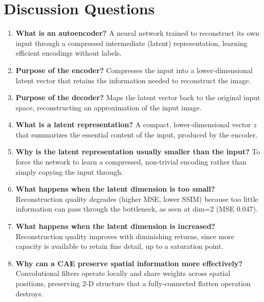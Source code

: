 \documentclass[10pt]{article}
\begin{document}
\section{Discussion Questions}

\begin{enumerate}[label=\arabic*.]
\item \textbf{What is an autoencoder?} A neural network trained to reconstruct its own input through a
compressed intermediate (latent) representation, learning efficient encodings without labels.

\item \textbf{Purpose of the encoder?} Compresses the input into a lower-dimensional latent vector that
retains the information needed to reconstruct the image.

\item \textbf{Purpose of the decoder?} Maps the latent vector back to the original input space,
reconstructing an approximation of the input image.

\item \textbf{What is a latent representation?} A compact, lower-dimensional vector $z$ that summarizes
the essential content of the input, produced by the encoder.

\item \textbf{Why is the latent representation usually smaller than the input?} To force the network to
learn a compressed, non-trivial encoding rather than simply copying the input through.

\item \textbf{What happens when the latent dimension is too small?} Reconstruction quality degrades
(higher MSE, lower SSIM) because too little information can pass through the bottleneck, as seen at
dim=2 (MSE 0.047).

\item \textbf{What happens when the latent dimension is increased?} Reconstruction quality improves with
diminishing returns, since more capacity is available to retain fine detail, up to a saturation point.

\item \textbf{Why can a CAE preserve spatial information more effectively?} Convolutional filters operate
locally and share weights across spatial positions, preserving 2-D structure that a fully-connected
flatten operation destroys.


\end{enumerate}
\end{document}
